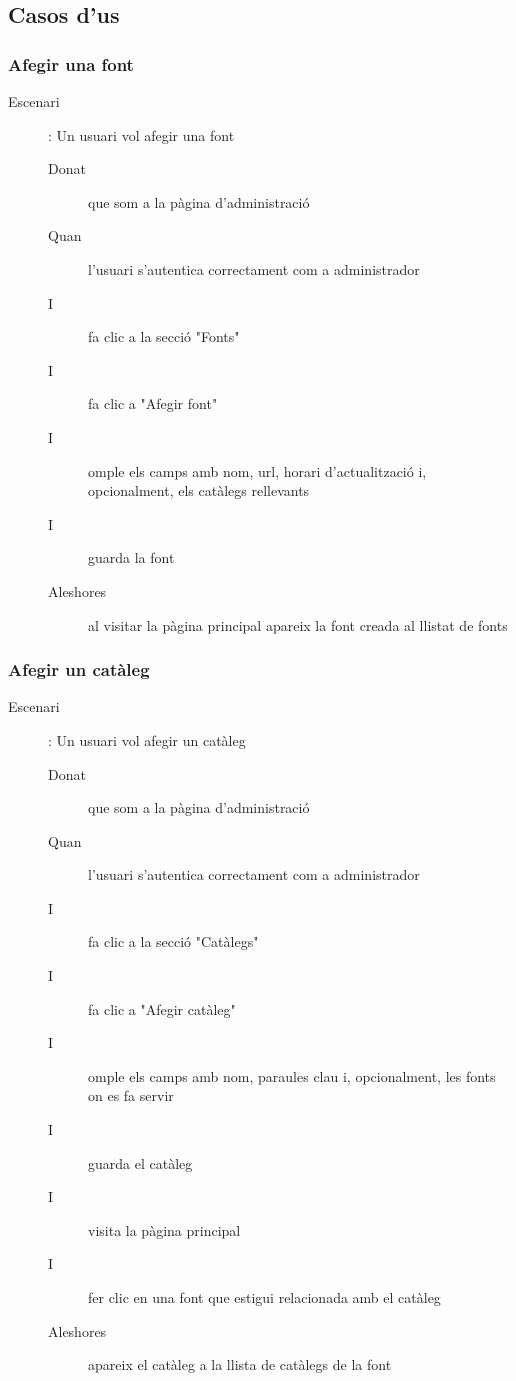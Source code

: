 \documentclass{article}
\begin{document}
\newpage

\subsection{Casos d'us}



\subsubsection{Afegir una font}

\begin{description}
    \item[Escenari]: Un usuari vol afegir una font
    \begin{description}
        \item[Donat] que som a la pàgina d'administració
        \item[Quan] l'usuari s'autentica correctament com a administrador
        \item[I] fa clic a la secció "Fonts"
        \item[I] fa clic a "Afegir font"
        \item[I] omple els camps amb nom, url, horari d'actualització i, opcionalment, els catàlegs rellevants
        \item[I] guarda la font
        \item[Aleshores] al visitar la pàgina principal apareix la font creada al llistat de fonts
    \end{description}
\end{description}

\subsubsection{Afegir un catàleg}

\begin{description}
    \item[Escenari]: Un usuari vol afegir un catàleg
    \begin{description}
        \item[Donat] que som a la pàgina d'administració
        \item[Quan] l'usuari s'autentica correctament com a administrador
        \item[I] fa clic a la secció "Catàlegs"
        \item[I] fa clic a "Afegir catàleg"
        \item[I] omple els camps amb nom, paraules clau i, opcionalment, les fonts on es fa servir
        \item[I] guarda el catàleg
        \item[I] visita la pàgina principal
        \item[I] fer clic en una font que estigui relacionada amb el catàleg
        \item[Aleshores] apareix el catàleg a la llista de catàlegs de la font
    \end{description}
\end{description}
\end{document}
